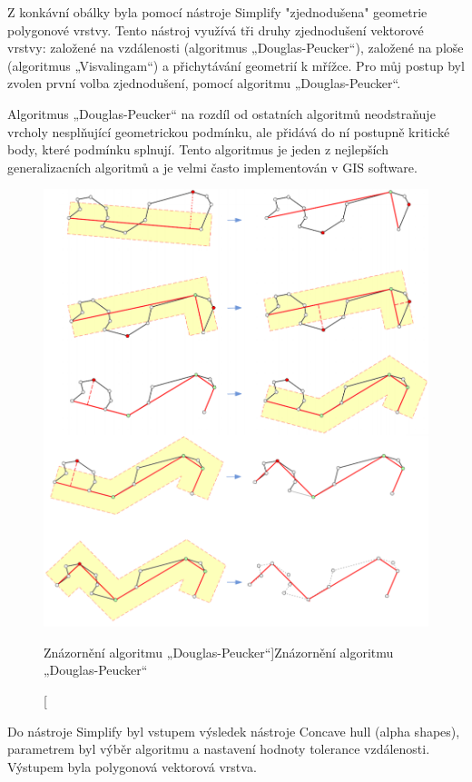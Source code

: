 Z konkávní obálky byla pomocí nástroje Simplify "zjednodušena" geometrie polygonové vrstvy. Tento nástroj
využívá tři druhy zjednodušení vektorové vrstvy: založené na vzdálenosti (algoritmus „Douglas-Peucker“),
založené na ploše (algoritmus „Visvalingam“) a přichytávání geometrií k mřížce.
Pro můj postup byl zvolen první volba zjednodušení, pomocí algoritmu „Douglas-Peucker“.

Algoritmus „Douglas-Peucker“ na rozdíl od ostatních algoritmů neodstraňuje vrcholy nesplňující 
geometrickou podmínku, ale přidává do ní postupně kritické body, které podmínku splnují.
Tento algoritmus je jeden z nejlepších generalizacních algoritmů a je velmi často
implementován v GIS software. \cite{bayer-douglas}

\begin{figure}[H] \centering
    \includegraphics[width=400pt]{./pictures/douglas.png}
    \caption[Znázornění algoritmu „Douglas-Peucker“]{Znázornění algoritmu „Douglas-Peucker“ \cite{bayer-douglas}}
	\label{fig:douglas}              
\end{figure} 

Do nástroje Simplify byl vstupem výsledek nástroje Concave hull (alpha shapes), parametrem byl výběr algoritmu 
a nastavení hodnoty tolerance vzdálenosti. Výstupem byla polygonová vektorová vrstva.

